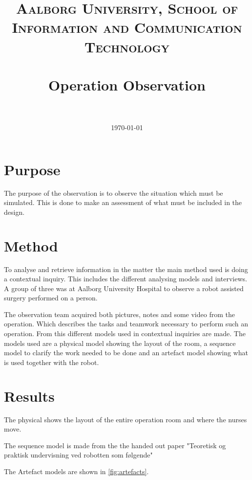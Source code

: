 \documentclass[paper=a4, fontsize=11pt]{scrartcl} %
\title{	
\normalfont \normalsize 
\textsc{Aalborg University, School of Information and Communication Technology} \\ [25pt] %
\horrule{0.5pt} \\[0.4cm] %
\huge Operation Observation \\ %
\horrule{2pt} \\[0.5cm] %
}
\date{\normalsize\today} %
\numberwithin{equation}{section} %
\numberwithin{figure}{section} %
\numberwithin{table}{section} %
\begin{document}
\maketitle %


\section{Purpose}
The purpose of the observation is to observe the situation which must be simulated. This is done to make an assessment of what must be included in the design.  

\section{Method}
To analyse and retrieve information in the matter the main method used is doing a contextual inquiry. This includes the different analysing models and interviews. A group of three was at Aalborg University Hospital to observe a robot assisted surgery performed on a person.

The observation team acquired both pictures, notes and some video from the operation. Which describes the tasks and teamwork necessary to perform such an operation. From this different models used in contextual inquiries are made. The models used are a physical model showing the layout of the room, a sequence model to clarify the work needed to be done and an artefact model showing what is used together with the robot.

\section{Results}
The physical shows the layout of the entire operation room and where the nurses move.

The sequence model is made from the the handed out paper "Teoretisk og praktisk undervisning ved robotten som følgende"

The Artefact models are shown in \autoref{fig:artefacts}.
\end{document}
